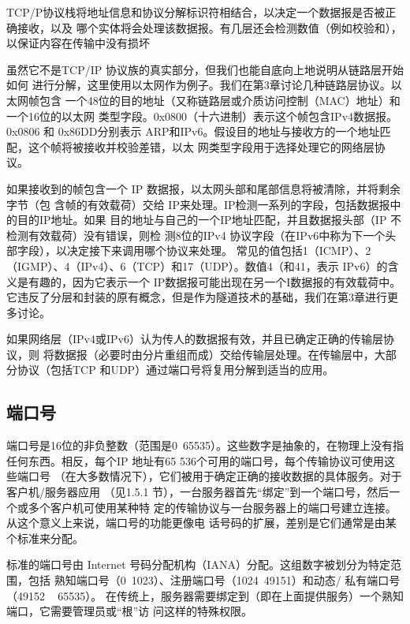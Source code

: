 TCP/P协议栈将地址信息和协议分解标识符相结合，以决定一个数据报是否被正确接收，以及
哪个实体将会处理该数据报。有几层还会检测数值（例如校验和），以保证内容在传输中没有损坏

虽然它不是TCP/IP 协议族的真实部分，但我们也能自底向上地说明从链路层开始如何
进行分解，这里使用以太网作为例子。我们在第3章讨论几种链路层协议。以太网帧包含
一个48位的目的地址（又称链路层或介质访问控制（MAC）地址）和一个16位的以太网
类型字段。0x0800（十六进制）表示这个帧包含IPv4数据报。0x0806 和 0x86DD分别表示
ARP和IPv6。假设目的地址与接收方的一个地址匹配，这个帧将被接收并校验差错，以太
网类型字段用于选择处理它的网络层协议。

如果接收到的帧包含一个 IP 数据报，以太网头部和尾部信息将被清除，并将剩余字节（包
含帧的有效载荷\footnotemark）交给 IP来处理。IP检测一系列的字段，包括数据报中的目的IP地址。如果
目的地址与自己的一个IP地址匹配，并且数据报头部（IP 不检测有效载荷）没有错误，则检
测8位的IPv4 协议字段（在IPv6中称为下一个头部字段），以决定接下来调用哪个协议来处理。
常见的值包括1（ICMP）、2（IGMP）、4（IPv4）、6（TCP）和17（UDP）。数值4（和41，表示
IPv6）的含义是有趣的，因为它表示一个 IP数据报可能出现在另一个I数据报的有效载荷中。
它违反了分层和封装的原有概念，但是作为隧道技术的基础，我们在第3章进行更多讨论。

如果网络层（IPv4或IPv6）认为传人的数据报有效，并且已确定正确的传输层协议，则
将数据报（必要时由分片重组而成）交给传输层处理。在传输层中，大部分协议（包括TCP
和UDP）通过端口号将复用分解到适当的应用。

\subsection{端口号}
端口号是16位的非负整数（范围是0~65535）。这些数字是抽象的，在物理上没有指
任何东西。相反，每个IP 地址有65 536个可用的端口号，每个传输协议可使用这些端口号
（在大多数情况下），它们被用于确定正确的接收数据的具体服务。对于客户机/服务器应用
（见1.5.1 节），一台服务器首先“绑定”到一个端口号，然后一个或多个客户机可使用某种特
定的传输协议与一台服务器上的端口号建立连接。从这个意义上来说，端口号的功能更像电
话号码的扩展，差别是它们通常是由某个标准来分配。

标准的端口号由 Internet 号码分配机构（IANA）分配。这组数字被划分为特定范围，包括
熟知端口号（0~1023）、注册端口号（1024~49151）和动态/ 私有端口号（49152 ~ 65535）。
在传统上，服务器需要绑定到（即在上面提供服务）一个熟知端口，它需要管理员或“根”访
问这样的特殊权限。

